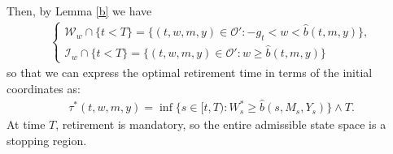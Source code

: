 \documentclass[a4paper,11pt]{amsart}
\numberwithin{equation}{section}
\newcommand{\blue}[1]{{\color{black}#1}}
\begin{document}
{Then, by Lemma \ref{b} we have 
\begin{align}\label{neww}
\begin{cases}
	\mathcal{W}_w \cap \{t<T\} =\{(t,w,m,y) \in \mathcal{O}': -g_t<w <\widehat{b}(t,m,y) \}, \\ \mathcal{I}_w \cap \{t<T\} =\{(t,w,m,y) \in  \mathcal{O}':  w\geq \widehat{b}(t,m,y) \}
	\end{cases}
\end{align}
so that we can express the optimal retirement time in terms of the initial coordinates as: {
\begin{align*}
\tau^\ast(t,w,m,y)=\inf\{s\in[t,T):W_s^\ast\geq\widehat b(s,M_s,Y_s)\}\wedge T.\tag{\theequation}\label{optimalretirement}
\end{align*}
}
\blue{At time $T$, retirement is mandatory, so the entire admissible state space is a stopping region.} 

}
\end{document}
